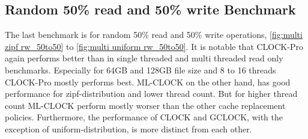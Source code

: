 \documentclass[
	12pt,
	a4paper,
	abstract,
	bibliography=totoc,
	chapterprefix,
	headings=openright,
	numbers=endperiod,
	parskip=half,
	twoside,
]{scrreprt}
\begin{document}
\newpage
\subsection{Random 50\% read and 50\% write Benchmark}

The last benchmark is for random 50\% read and 50\% write operations, \cref{fig:multi zipf rw_50to50} to 
\cref{fig:multi uniform rw_50to50}.
It is notable that CLOCK-Pro again performs better than in single threaded and multi threaded read only benchmarks.
Especially for 64GB and 128GB file size and 8 to 16 threads CLOCK-Pro mostly performs best.
ML-CLOCK on the other hand, has good performance for zipf-distribution and lower thread count.
But for higher thread count ML-CLOCK perform mostly worser than the other cache replacement policies.
Furthermore, the performance of CLOCK and GCLOCK, with the exception of uniform-distribution, 
is more distinct from each other.
\end{document}
